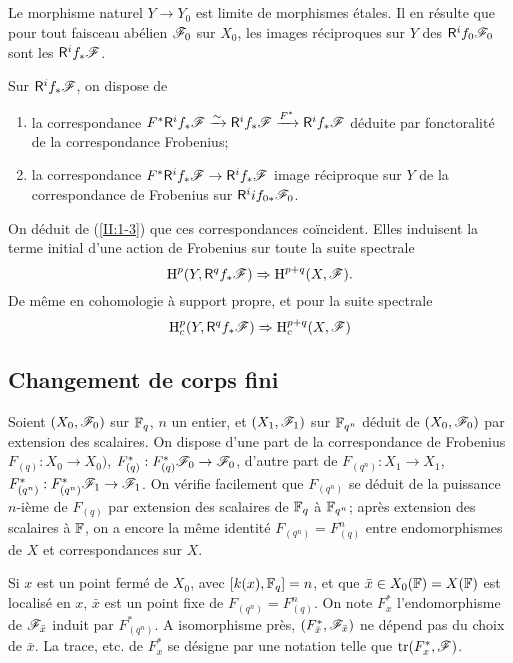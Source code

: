 \subsection{}\label{II:1-4}

Le morphisme naturel $Y\to Y_0$ est limite de morphismes étales. Il en 
résulte que pour tout faisceau abélien $\mathscr{F}_0$ sur $X_0$, les images 
réciproques sur $Y$ des $\mathsf{R}^if_0\mathscr{F}_0$ sont les $\mathsf{R}^if_*\mathscr{F}$. 

Sur $\mathsf{R}^if_*\mathscr{F}$, on dispose de 
\begin{enumerate}[\indent a)]
  \item la correspondance 
    $F^*\mathsf{R}^i f_*\mathscr{F} \xrightarrow\sim \mathsf{R}^i f_*\mathscr{F} \xrightarrow{F^*} \mathsf{R}^if_*\mathscr{F}$ déduite 
    par fonctoralité de la correspondance Frobenius; 
  \item la correspondance $F^*\mathsf{R}^if_*\mathscr{F}\to\mathsf{R}^if_*\mathscr{F}$ image réciproque sur 
    $Y$ de la correspondance de Frobenius sur $\mathsf{R}^ii f_{0*}\mathscr{F}_0$. 
\end{enumerate}

On déduit de (\ref{II:1-3}) que ces correspondances coïncident. Elles 
induisent la terme initial d'une action de Frobenius sur toute la suite 
spectrale 
\[
  \operatorname{H}^p(Y,\mathsf{R}^q f_*\mathscr{F}) \Rightarrow \operatorname{H}^{p+q}(X,\mathscr{F}) \text{.}
\]
De même en cohomologie à support propre, et pour la suite spectrale 
\[
  \operatorname{H}_c^p(Y,\mathsf{R}^q f_* \mathscr{F}) \Rightarrow \operatorname{H}_c^{p+q}(X,\mathscr{F})
\]





\subsection{Changement de corps fini}\label{II:1-5}

Soient $(X_0,\mathscr{F}_0)$ sur $\mathbb{F}_q$, $n$ un entier, et $(X_1,\mathscr{F}_1)$ sur 
$\mathbb{F}_{q^n}$ déduit de $(X_0,\mathscr{F}_0)$ par extension des scalaires. On dispose 
d'une part de la correspondance de Frobenius $F_{(q)}:X_0\to X_0)$, 
$F_{(q)}^*:F_{(q)}^*\mathscr{F}_0\to \mathscr{F}_0$, d'autre part de 
$F_{(q^n)}:X_1\to X_1$, $F_{(q^n)}^*:F_{(q^n)}^*\mathscr{F}_1\to\mathscr{F}_1$. On vérifie 
facilement que $F_{(q^n)}$ se déduit de la puissance $n$-ième de $F_{(q)}$ 
par extension des scalaires de $\mathbb{F}_q$ à $\mathbb{F}_{q^n}$; après extension des 
scalaires à $\mathbb{F}$, on a encore la même identité $F_{(q^n)}=F_{(q)}^n$ 
entre endomorphismes de $X$ et correspondances sur $X$. 

Si $x$ est un point fermé de $X_0$, avec $[k(x),\mathbb{F}_q]=n$, et que 
$\bar x\in X_0(\mathbb{F}) = X(\mathbb{F})$ est localisé en $x$, $\bar x$ est un point 
fixe de $F_{(q^n)}=F_{(q)}^n$. On note $F_x^*$ l'endomorphisme de 
$\mathscr{F}_{\bar x}$ induit par $F_{(q^n)}^*$. A isomorphisme près, 
$(F_{\bar x}^*,\mathscr{F}_{\bar x})$ ne dépend pas du choix de $\bar x$. La trace, 
etc. de $F_x^*$ se désigne par une notation telle que 
$\operatorname{tr}(F_x^*,\mathscr{F})$. 





